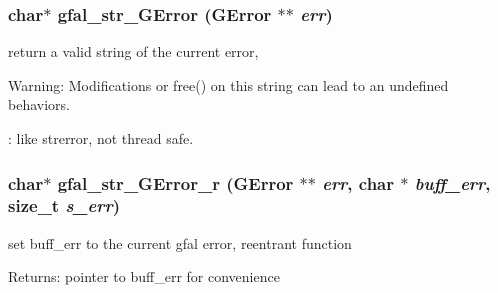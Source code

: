 \subsubsection{\setlength{\rightskip}{0pt plus 5cm}char$\ast$ gfal\_\-str\_\-GError (GError $\ast$$\ast$ {\em err})}\label{gfal__common__errverbose_8c_c35c45ff43533cc6e7c176b0fa0b3128}


return a valid string of the current error, \begin{Desc}
\item[Warning:]Modifications or free() on this string can lead to an undefined behaviors. 

: like strerror, not thread safe. \end{Desc}
\subsubsection{\setlength{\rightskip}{0pt plus 5cm}char$\ast$ gfal\_\-str\_\-GError\_\-r (GError $\ast$$\ast$ {\em err}, char $\ast$ {\em buff\_\-err}, size\_\-t {\em s\_\-err})}\label{gfal__common__errverbose_8c_4dec12f0df920db39c004776d7f04e6e}


set buff\_\-err to the current gfal error, reentrant function \begin{Desc}
\item[Returns:]pointer to buff\_\-err for convenience \end{Desc}
